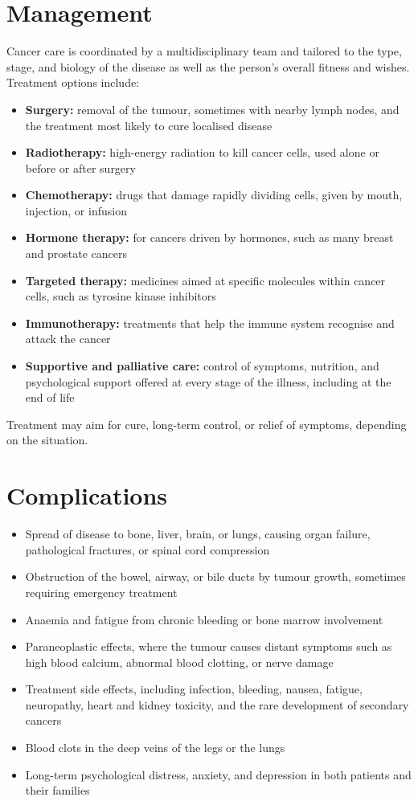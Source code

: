 \section*{Management}
Cancer care is coordinated by a multidisciplinary team and tailored to the type, stage, and biology of the disease as well as the person's overall fitness and wishes. Treatment options include:
\begin{itemize}
    \item \textbf{Surgery:} removal of the tumour, sometimes with nearby lymph nodes, and the treatment most likely to cure localised disease
    \item \textbf{Radiotherapy:} high-energy radiation to kill cancer cells, used alone or before or after surgery
    \item \textbf{Chemotherapy:} drugs that damage rapidly dividing cells, given by mouth, injection, or infusion
    \item \textbf{Hormone therapy:} for cancers driven by hormones, such as many breast and prostate cancers
    \item \textbf{Targeted therapy:} medicines aimed at specific molecules within cancer cells, such as tyrosine kinase inhibitors
    \item \textbf{Immunotherapy:} treatments that help the immune system recognise and attack the cancer
    \item \textbf{Supportive and palliative care:} control of symptoms, nutrition, and psychological support offered at every stage of the illness, including at the end of life
\end{itemize}
Treatment may aim for cure, long-term control, or relief of symptoms, depending on the situation.

\section*{Complications}
\begin{itemize}
    \item Spread of disease to bone, liver, brain, or lungs, causing organ failure, pathological fractures, or spinal cord compression
    \item Obstruction of the bowel, airway, or bile ducts by tumour growth, sometimes requiring emergency treatment
    \item Anaemia and fatigue from chronic bleeding or bone marrow involvement
    \item Paraneoplastic effects, where the tumour causes distant symptoms such as high blood calcium, abnormal blood clotting, or nerve damage
    \item Treatment side effects, including infection, bleeding, nausea, fatigue, neuropathy, heart and kidney toxicity, and the rare development of secondary cancers
    \item Blood clots in the deep veins of the legs or the lungs
    \item Long-term psychological distress, anxiety, and depression in both patients and their families
\end{itemize}

